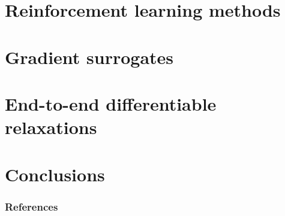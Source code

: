 \documentclass[xetex,aspectratio=169,xcolor,professionalfonts,hyperref]{beamer}
\begin{document}
\section{Reinforcement learning methods}

\section{Gradient surrogates}

\section{End-to-end differentiable relaxations}

\section{Conclusions}



\begin{frame}[t,allowframebreaks]
\frametitle{References}
\scriptsize


\end{frame}
\end{document}
